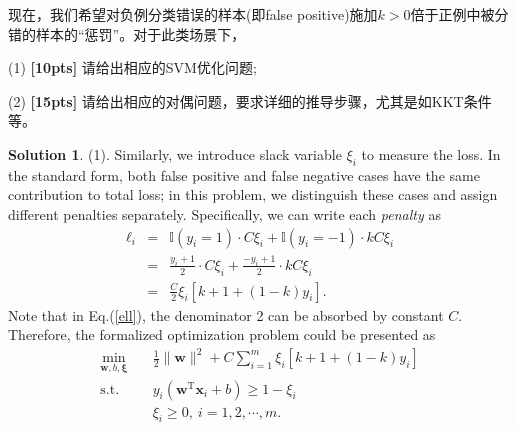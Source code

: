 \documentclass[a4paper,UTF8]{article}
\numberwithin{equation}{section}
\theoremstyle{definition}
\newtheorem*{solution}{Solution}
\begin{document}
现在，我们希望对负例分类错误的样本(即false positive)施加$k>0$倍于正例中被分错的样本的“惩罚”。对于此类场景下，

(1) \textbf{[10pts]} 请给出相应的SVM优化问题;

(2) \textbf{[15pts]} 请给出相应的对偶问题，要求详细的推导步骤，尤其是如KKT条件等。
\begin{solution}
\item[(1).]
Similarly, we introduce slack variable $\xi_i$ to measure the loss. In the standard form, both false positive and false negative cases have the same contribution to total loss; in this problem, we distinguish these cases and assign different penalties separately. Specifically, we can write each \textit{penalty} as
\begin{eqnarray}\label{ell}
\ell_i&=&\mathbb{I}(y_i=1)\cdot C\xi_i+\mathbb{I}(y_i=-1)\cdot kC\xi_i\nonumber\\
&=&\frac{y_i+1}{2}\cdot C\xi_i+\frac{-y_i+1}{2}\cdot kC\xi_i\nonumber\\
&=&\frac{C}{2}\xi_i[k+1+(1-k)y_i].
\end{eqnarray}
Note that in Eq.(\ref{ell}), the denominator 2 can be absorbed by constant $C$. Therefore, the formalized optimization problem could be presented as
\begin{equation}
\label{mod-svm}
\begin{split}
\min_{\bm{w},b,\bm{\xi}}& \quad \frac{1}{2} \lVert \mathbf{w} \rVert^2 + C\sum_{i=1}^m\xi_i[k+1+(1-k)y_i]\\
\text{s.t.}&  \quad y_i(\bm{w}^\mathrm{T}\bm{x}_i + b)\geq 1-\xi_i\\
& \quad \xi_i \geq 0, \  i = 1,2,\cdots,m.
\end{split}
\end{equation}


\end{solution}
\end{document}
